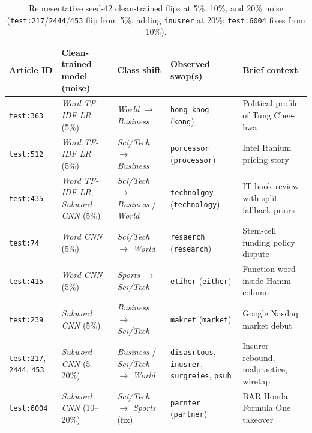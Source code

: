 \begin{table}[H]
\centering\small\setlength{\tabcolsep}{3.5pt}
\begin{tabularx}{\linewidth}{@{}>{\raggedright\arraybackslash}p{18mm}>{\raggedright\arraybackslash}p{29mm}>{\raggedright\arraybackslash}p{28mm}>{\raggedright\arraybackslash}p{31mm}>{\raggedright\arraybackslash}X@{}}
\toprule
Article ID & Clean-trained model (noise) & Class shift & Observed swap(s) & Brief context \\
\midrule
\texttt{test:363} & \textit{Word TF-IDF LR} (5\%) & \emph{World} $\to$ \emph{Business} & \texttt{hong knog} (\texttt{kong}) & Political profile of Tung Chee-hwa \\
\texttt{test:512} & \textit{Word TF-IDF LR} (5\%) & \emph{Sci/Tech} $\to$ \emph{Business} & \texttt{porcessor} (\texttt{processor}) & Intel Itanium pricing story \\
\texttt{test:435} & \textit{Word TF-IDF LR}, \textit{Subword CNN} (5\%) & \emph{Sci/Tech} $\to$ \emph{Business} / \emph{World} & \texttt{technolgoy} (\texttt{technology}) & IT book review with split fallback priors \\
\texttt{test:74} & \textit{Word CNN} (5\%) & \emph{Sci/Tech} $\to$ \emph{World} & \texttt{resaerch} (\texttt{research}) & Stem-cell funding policy dispute \\
\texttt{test:415} & \textit{Word CNN} (5\%) & \emph{Sports} $\to$ \emph{Sci/Tech} & \texttt{etiher} (\texttt{either}) & Function word inside Hamm column \\
\texttt{test:239} & \textit{Subword CNN} (5\%) & \emph{Business} $\to$ \emph{Sci/Tech} & \texttt{makret} (\texttt{market}) & Google Nasdaq market debut \\
\texttt{test:217}, \texttt{2444}, \texttt{453} & \textit{Subword CNN} (5--20\%) & \emph{Business} / \emph{Sci/Tech} $\to$ \emph{World} & \texttt{disasrtous}, \texttt{inusrer}, \texttt{surgreies}, \texttt{psuh} & Insurer rebound, malpractice, wiretap \\
\texttt{test:6004} & \textit{Subword CNN} (10--20\%) & \emph{Sci/Tech} $\to$ \emph{Sports} (fix) & \texttt{parnter} (\texttt{partner}) & BAR Honda Formula One takeover \\
\bottomrule
\end{tabularx}
\caption[Concrete article error examples]{Representative seed-42 clean-trained flips at 5\%, 10\%, and 20\% noise (\texttt{test:217}/\texttt{2444}/\texttt{453} flip from 5\%, adding \texttt{inusrer} at 20\%; \texttt{test:6004} fixes from 10\%).}
\label{tab:error-examples}
\end{table}

